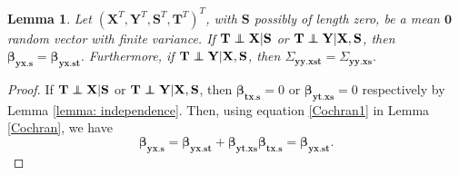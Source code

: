\documentclass[11pt,a4paper]{article}
\newtheorem{Lemma}[Satz]{Lemma}
\theoremstyle{definition}
\theoremstyle{remark}
\newcommand\ci{\protect\mathpalette{\protect\independenT}{\perp}}
\def\independenT#1#2{\mathrel{\rlap{$#1#2$}\mkern2mu{#1#2}}}
\begin{document}
\begin{Lemma}
Let $(\mathbf{X}^T,\mathbf{Y}^T,\mathbf{S}^T,\mathbf{T}^T)^T$, with $\mathbf{S}$ possibly of length zero, be a mean $\mathbf{0}$ random vector with finite variance. If $\mathbf{T} \ci \mathbf{X} | \mathbf{S}$ or $\mathbf{T} \ci \mathbf{Y} | \mathbf{X}, \mathbf{S}$, then
$
\boldsymbol{\beta}_{\mathbf{yx}.\mathbf{s}} = \boldsymbol{\beta}_{\mathbf{yx}.\mathbf{st}}.
$
Furthermore, if $\mathbf{T} \ci \mathbf{Y}| \mathbf{X} , \mathbf{S}$, then
$
\Sigma_{\mathbf{yy}.\mathbf{xst}} = \Sigma_{\mathbf{yy}.\mathbf{xs}}.$


\label{Wermuth}
\end{Lemma}


\begin{proof} If $\mathbf{T} \ci \mathbf{X} | \mathbf{S}$ or $\mathbf{T} \ci \mathbf{Y} | \mathbf{X}, \mathbf{S}$, then $\boldsymbol{\beta}_{\mathbf{tx}.\mathbf{s}} =0$ or $\boldsymbol{\beta}_{\mathbf{yt}.\mathbf{xs}} =0$ respectively by Lemma \ref{lemma: independence}. Then, using equation  \eqref{Cochran1} in Lemma \ref{Cochran}, we have
\[
\boldsymbol{\beta}_{\mathbf{yx}.\mathbf{s}} = \boldsymbol{\beta}_{\mathbf{yx}.\mathbf{st}} + \boldsymbol{\beta}_{\mathbf{yt}.\mathbf{xs}} \boldsymbol{\beta}_{\mathbf{tx}.\mathbf{s}} = \boldsymbol{\beta}_{\mathbf{yx}.\mathbf{st}}.
\]


\end{proof}
\end{document}
